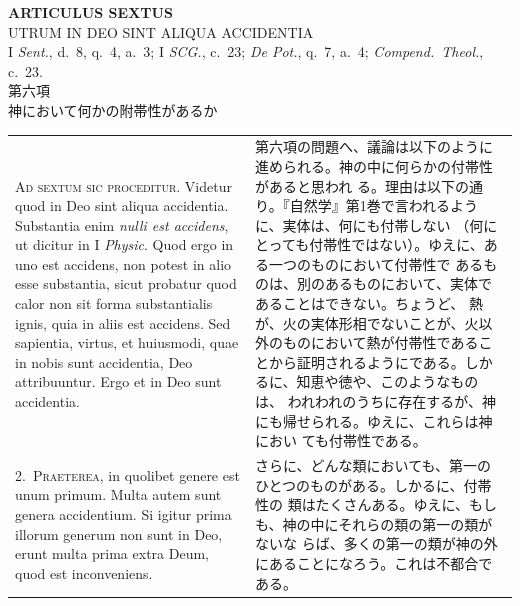 \documentclass[paper=a4paper,fontsize=10pt,jafontsize=9pt,titlepage]{jlreq}
\begin{document}
\newpage
{}


\begin{center}
 {\Large {\bfseries ARTICULUS SEXTUS}}\\
 {\large UTRUM IN DEO SINT ALIQUA ACCIDENTIA}\\
 {\footnotesize I {\itshape Sent.}, d.~8, q.~4, a.~3; I {\itshape SCG.},
 c.~23; {\itshape De Pot.}, q.~7, a.~4; {\itshape Compend.~Theol.},
 c.~23.}\\
 {\Large 第六項\\神において何かの附帯性があるか}
\end{center}

\begin{longtable}{p{21em}p{21em}}

{\huge A}{\scshape d sextum sic proceditur}. Videtur quod in Deo sint aliqua
 accidentia. Substantia enim {\itshape nulli est accidens}, ut dicitur in I
 {\itshape Physic}. Quod ergo in uno est accidens, non potest in alio esse
 substantia, sicut probatur quod calor non sit forma substantialis
 ignis, quia in aliis est accidens. Sed sapientia, virtus, et huiusmodi,
 quae in nobis sunt accidentia, Deo attribuuntur. Ergo et in Deo sunt
 accidentia.

&

第六項の問題へ、議論は以下のように進められる。神の中に何らかの付帯性があると思われ
 る。理由は以下の通り。『自然学』第1巻で言われるように、実体は、何にも付帯しない
 （何にとっても付帯性ではない）。ゆえに、ある一つのものにおいて付帯性で
 あるものは、別のあるものにおいて、実体であることはできない。ちょうど、
 熱が、火の実体形相でないことが、火以外のものにおいて熱が付帯性であるこ
 とから証明されるようにである。しかるに、知恵や徳や、このようなものは、
 われわれのうちに存在するが、神にも帰せられる。ゆえに、これらは神におい
 ても付帯性である。


\\



2.~{\scshape Praeterea}, in quolibet genere est unum primum. Multa autem sunt
 genera accidentium. Si igitur prima illorum generum non sunt in Deo,
 erunt multa prima extra Deum, quod est inconveniens.

&

さらに、どんな類においても、第一のひとつのものがある。しかるに、付帯性の
 類はたくさんある。ゆえに、もしも、神の中にそれらの類の第一の類がないな
 らば、多くの第一の類が神の外にあることになろう。これは不都合である。

\\



\end{longtable}
\end{document}
